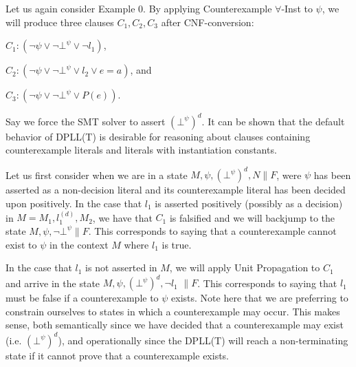 \documentclass{llncs}
\begin{document}
Let us again consider Example 0.
By applying Counterexample $\forall$-Inst to $\psi$, we will produce three clauses $C_1, C_2, C_3$ after CNF-conversion:

$C_1 : ( \neg \psi \vee \neg \bot^\psi \vee \neg l_1 )$,

$C_2 : ( \neg \psi \vee \neg \bot^\psi \vee l_2 \vee e = a )$, and

$C_3 : ( \neg \psi \vee \neg \bot^\psi \vee P( e ) )$.

Say we force the SMT solver to assert $( \bot^\psi )^d$.
It can be shown that the default behavior of DPLL(T) is desirable for reasoning about clauses containing counterexample literals and literals with instantiation constants.

Let us first consider when we are in a state $M, \psi, ( \bot^\psi )^d, N \parallel F$, were $\psi$ has been asserted as a non-decision literal and its counterexample literal has been decided upon positively.
In the case that $l_1$ is asserted positively (possibly as a decision) in $M = M_1, l^{(d)}_1, M_2$, we have that $C_1$ is falsified and we will backjump to the state $M, \psi, \neg \bot^\psi \parallel F$.
This corresponds to saying that a counterexample cannot exist to $\psi$ in the context $M$ where $l_1$ is true.

In the case that $l_1$ is not asserted in $M$, we will apply Unit Propagation to $C_1$ and arrive in the state $M, \psi, ( \bot^\psi )^d, \neg l_1$ $\parallel F$.
This corresponds to saying that $l_1$ must be false if a counterexample to $\psi$ exists.
Note here that we are preferring to constrain ourselves to states in which a counterexample may occur.
This makes sense, both semantically since we have decided that a counterexample may exist (i.e. $( \bot^\psi )^d$), and operationally since the DPLL(T) will reach a non-terminating state if it cannot prove that a counterexample exists.

\end{document}
